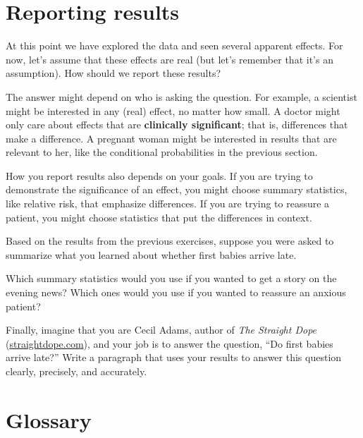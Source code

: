 \documentclass[12pt]{book}
\begin{document}
\section{Reporting results}

At this point we have explored the data and seen several apparent
effects.  For now, let's assume that these effects are real (but let's
remember that it's an assumption).  How should we report these
results?

The answer might depend on who is asking the question.  For example,
a scientist might be interested in any (real) effect, no matter how
small.  A doctor might only care about effects that are
{\bf clinically significant}; that is, differences that make a difference.
A pregnant woman might be interested in results that are relevant to
her, like the conditional probabilities in the previous section.

How you report results also depends on your goals.  If you are
trying to demonstrate the significance of an effect, you might choose
summary statistics, like relative risk, that emphasize differences.
If you are trying to reassure a patient, you might choose statistics
that put the differences in context.

\begin{ex}

Based on the results from the previous exercises, suppose you were
asked to summarize what you learned about whether first
babies arrive late.

Which summary statistics would you use if you wanted to get a story
on the evening news?  Which ones would you use if you wanted to
reassure an anxious patient?

Finally, imagine that you are Cecil Adams, author of {\it The Straight
  Dope} (\url{straightdope.com}), and your job is to answer the
question, ``Do first babies arrive late?''  Write a paragraph that
uses your results to answer this question clearly, precisely, and
accurately.

\end{ex}



\section{Glossary}
\end{document}
